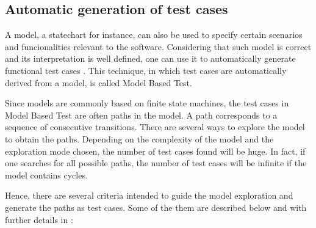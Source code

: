 \subsection{Automatic generation of test cases}
\label{sec-autotestcases}

A model, a statechart for instance, can also be used to specify certain scenarios and funcionalities relevant to the software. Considering that such model is correct and its interpretation is well defined, one can use it to automatically generate functional test cases \cite{Maldonado:07}. This technique, in which test cases are automatically derived from a model, is called Model Based Test.

Since models are commonly based on finite state machines, the test cases in Model Based Test are often paths in the model. A path corresponds to a sequence of consecutive transitions. There are several ways to explore the model to obtain the paths. Depending on the complexity of the model and the exploration mode chosen, the number of test cases found will be huge. In fact, if one searches for all possible paths, the number of test cases will be infinite if the model contains cycles.

Hence, there are several criteria intended to guide the model exploration and generate the paths as test cases. Some of the them are described below and with further details in \cite{inpe10}:

